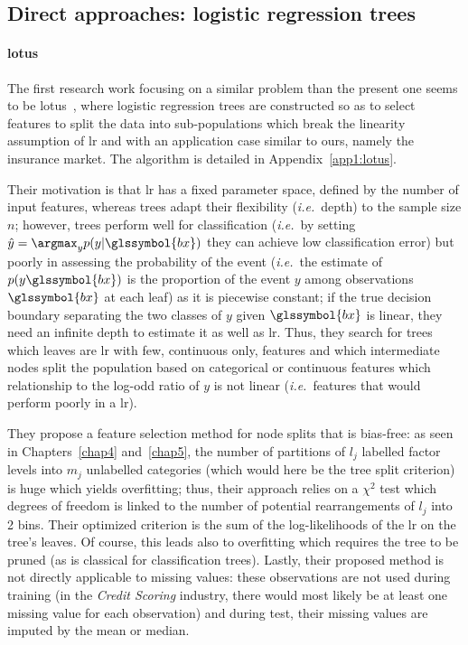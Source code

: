 \subsection{Direct approaches: logistic regression trees}

\paragraph{\gls{lotus}}

The first research work focusing on a similar problem than the present one seems to be \gls{lotus}~\cite{chan2004lotus}, where logistic regression trees are constructed so as to select features to split the data into sub-populations which break the linearity assumption of \gls{lr} and with an application case similar to ours, namely the insurance market. The algorithm is detailed in Appendix~\ref{app1:lotus}.

Their motivation is that \gls{lr} has a fixed parameter space, defined by the number of input features, whereas trees adapt their flexibility (\textit{i.e.}\ depth) to the sample size $n$; however, trees perform well for classification (\textit{i.e.}\ by setting $\hat{y} = \argmax_y p(y | \glssymbol{bx})$ they can achieve low classification error) but poorly in assessing the probability of the event (\textit{i.e.}\ the estimate of $p(y\glssymbol{bx})$ is the proportion of the event $y$ among observations $\glssymbol{bx}$ at each leaf) as it is piecewise constant; if the true decision boundary separating the two classes of $y$ given $\glssymbol{bx}$ is linear, they need an infinite depth to estimate it as well as \gls{lr}. Thus, they search for trees which leaves are \gls{lr} with few, continuous only, features and which intermediate nodes split the population based on categorical or continuous features which relationship to the log-odd ratio of $y$ is not linear (\textit{i.e.}\ features that would perform poorly in a \gls{lr}).

They propose a feature selection method for node splits that is bias-free: as seen in Chapters~\ref{chap4} and~\ref{chap5}, the number of partitions of $l_j$ labelled factor levels into $m_j$ unlabelled categories (which would here be the tree split criterion) is huge which yields overfitting; thus, their approach relies on a $\chi^2$ test which degrees of freedom is linked to the number of potential rearrangements of $l_j$ into 2 bins. Their optimized criterion is the sum of the log-likelihoods of the \gls{lr} on the tree's leaves. Of course, this leads also to overfitting which requires the tree to be pruned (as is classical for classification trees). Lastly, their proposed method is not directly applicable to missing values: these observations are not used during training (in the \textit{Credit Scoring} industry, there would most likely be at least one missing value for each observation) and during test, their missing values are imputed by the mean or median.

